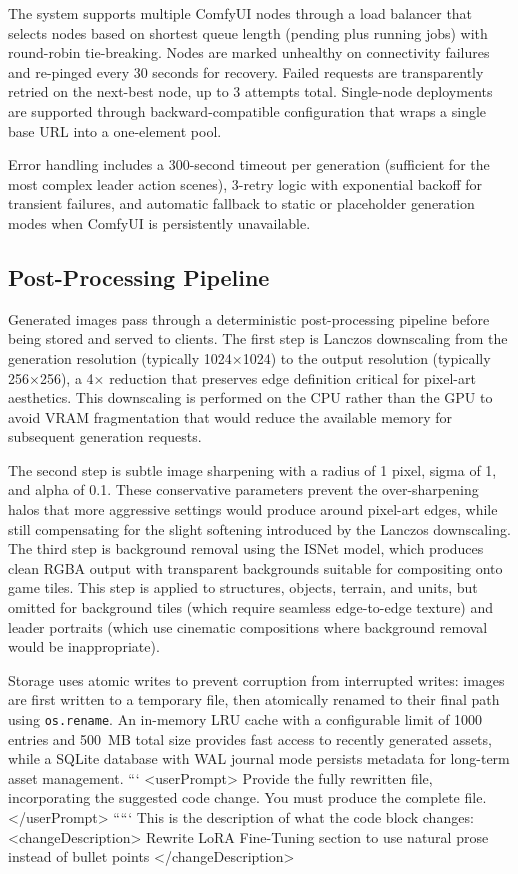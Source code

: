 \documentclass[conference]{IEEEtran}
\begin{document}
The system supports multiple ComfyUI nodes through a load balancer that selects nodes based on shortest queue length (pending plus running jobs) with round-robin tie-breaking. Nodes are marked unhealthy on connectivity failures and re-pinged every 30 seconds for recovery. Failed requests are transparently retried on the next-best node, up to 3 attempts total. Single-node deployments are supported through backward-compatible configuration that wraps a single base URL into a one-element pool.

Error handling includes a 300-second timeout per generation (sufficient for the most complex leader action scenes), 3-retry logic with exponential backoff for transient failures, and automatic fallback to static or placeholder generation modes when ComfyUI is persistently unavailable.

\subsection{Post-Processing Pipeline}

Generated images pass through a deterministic post-processing pipeline before being stored and served to clients. The first step is Lanczos downscaling from the generation resolution (typically 1024$\times$1024) to the output resolution (typically 256$\times$256), a 4$\times$ reduction that preserves edge definition critical for pixel-art aesthetics. This downscaling is performed on the CPU rather than the GPU to avoid VRAM fragmentation that would reduce the available memory for subsequent generation requests.

The second step is subtle image sharpening with a radius of 1 pixel, sigma of 1, and alpha of 0.1. These conservative parameters prevent the over-sharpening halos that more aggressive settings would produce around pixel-art edges, while still compensating for the slight softening introduced by the Lanczos downscaling. The third step is background removal using the ISNet model, which produces clean RGBA output with transparent backgrounds suitable for compositing onto game tiles. This step is applied to structures, objects, terrain, and units, but omitted for background tiles (which require seamless edge-to-edge texture) and leader portraits (which use cinematic compositions where background removal would be inappropriate).

Storage uses atomic writes to prevent corruption from interrupted writes: images are first written to a temporary file, then atomically renamed to their final path using \texttt{os.rename}. An in-memory LRU cache with a configurable limit of 1000 entries and 500~MB total size provides fast access to recently generated assets, while a SQLite database with WAL journal mode persists metadata for long-term asset management.
```
<userPrompt>
Provide the fully rewritten file, incorporating the suggested code change. You must produce the complete file.
</userPrompt>
`````
This is the description of what the code block changes:
<changeDescription>
Rewrite LoRA Fine-Tuning section to use natural prose instead of bullet points
</changeDescription>
\end{document}

